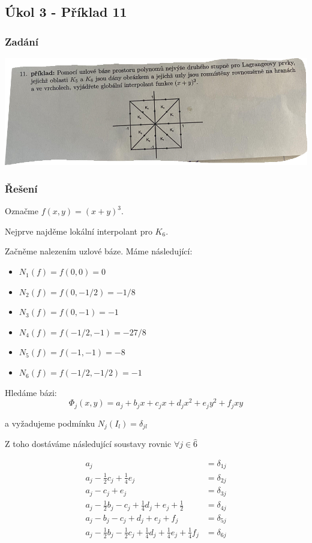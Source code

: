 \documentclass[../main.tex]{subfiles}
\begin{document}
\subsection{Úkol 3 - Příklad 11}
\subsubsection{Zadání}


\includegraphics[width=1\textwidth]{images/zadani-ukol3-pr11.png}



\subsubsection{Řešení}
Označme $f(x,y) = (x+y)^3$.


Nejprve najděme lokální interpolant pro $K_6$.

Začněme nalezením uzlové báze. Máme následující:

\begin{itemize}
    \item $N_1(f) = f (0,0) = 0 $
    \item $N_2(f) = f (0,-1/2) = -1/8$
    \item $N_3(f) = f (0,-1) = -1$
    \item $N_4(f) = f (-1/2,-1) = -27/8$
    \item $N_5(f) = f (-1,-1) = -8$
    \item $N_6(f) = f (-1/2,-1/2) = -1$
\end{itemize}

Hledáme bázi:\begin{equation}\label{eq:bazeukol}
    \Phi_j(x,y) = a_j +b_jx +c_jx +d_jx^2+e_jy^2+f_jxy
\end{equation}

a vyžadujeme podmínku $N_j(I_l)=\delta_{jl}$

Z toho dostáváme následující soustavy rovnic $\forall j \in \hat{6}$

\begin{align*}
    a_j &= \delta_{1j}\\
    a_j - \frac{1}{2}c_j + \frac{1}{4}e_j &= \delta_{2j}\\
    a_j -c_j +e_j &= \delta_{3j}\\
    a_j -\frac{1}{2}b_j -c_j +\frac{1}{4}d_j +e_j +\frac{1}{2} &= \delta_{4j}\\
    a_j -b_j-c_j+d_j+e_j+f_j &= \delta_{5j}\\
    a_j -\frac{1}{2}b_j -\frac{1}{2}c_j +\frac{1}{4}d_j + \frac{1}{4}e_j + \frac{1}{4}f_j&= \delta_{6j}\\
\end{align*}
\end{document}
